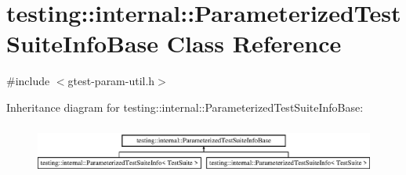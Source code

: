\hypertarget{classtesting_1_1internal_1_1_parameterized_test_suite_info_base}{}\section{testing\+::internal\+::Parameterized\+Test\+Suite\+Info\+Base Class Reference}
\label{classtesting_1_1internal_1_1_parameterized_test_suite_info_base}


{\ttfamily \#include $<$gtest-\/param-\/util.\+h$>$}

Inheritance diagram for testing\+::internal\+::Parameterized\+Test\+Suite\+Info\+Base\+:\begin{figure}[H]
\begin{center}
\leavevmode
\includegraphics[height=1.656805cm]{dc/dc9/classtesting_1_1internal_1_1_parameterized_test_suite_info_base}
\end{center}
\end{figure}
